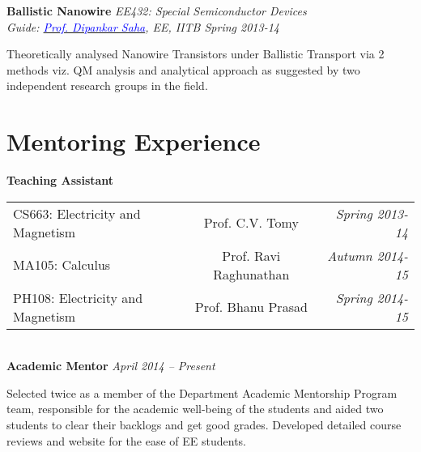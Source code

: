 \documentclass[margin,line]{res}
\newenvironment{list1}{
  \begin{list}{\ding{113}}{%
      \setlength{\itemsep}{0in}
      \setlength{\parsep}{0in} \setlength{\parskip}{0in}
      \setlength{\topsep}{0in} \setlength{\partopsep}{0in} 
      \setlength{\leftmargin}{0.17in}}}{\end{list}}
\begin{document}
\begin{resume}
\vspace*{-0.1in}

{\bf Ballistic Nanowire} \hfill \textit{EE432: Special Semiconductor Devices}\\
{\em Guide: \href{https://www.ee.iitb.ac.in/wiki/faculty/dsaha}{\textcolor{blue}{Prof. Dipankar Saha}}, EE, IITB \hfill Spring 2013-14}\\
\vspace*{-.15in}
\begin{list1}
\item[]Theoretically analysed Nanowire Transistors under Ballistic Transport via 2 methods viz. QM analysis and analytical approach as suggested by two independent research groups in the field.
\end{list1}

\section{\sc Mentoring Experience}
\textbf{Teaching Assistant}\\
\begin{tabular}{@{}p{2.77in}p{5in}p{3in}}
\strut\hspace{0.5cm}CS663: Electricity and Magnetism & \multicolumn{1}{c}{  Prof. C.V. Tomy  } & \multicolumn{1}{r}{\strut\hspace{1cm}\textit{Spring 2013-14}}\\
\strut\hspace{0.5cm}MA105: Calculus & \multicolumn{1}{c}{  Prof. Ravi Raghunathan  } & \multicolumn{1}{r}{\strut\hspace{1cm}\textit{Autumn 2014-15}}\\
\strut\hspace{0.5cm}PH108: Electricity and Magnetism & \multicolumn{1}{c}{  Prof. Bhanu Prasad  } & \multicolumn{1}{r}{\strut\hspace{1cm}\textit{Spring 2014-15}}\\
\end{tabular}\\
\textbf{Academic Mentor} \hfill \textit{April 2014 -- Present}\\
\vspace*{-.15in}
\begin{list1}
\item[]Selected twice as a member of the Department Academic Mentorship Program team, responsible for the academic well-being of the students and aided two students to clear their backlogs and get good grades. Developed detailed course reviews and website for the ease of EE students.
\end{list1}


\end{resume}
\end{document}
